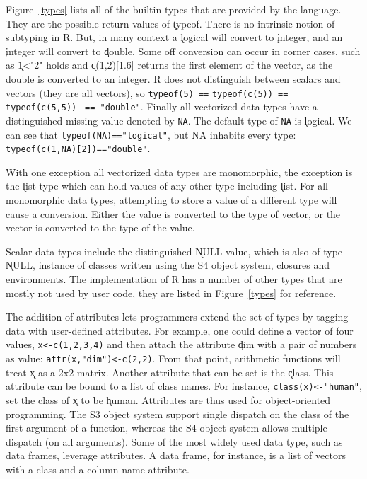 \documentclass[acmsmall,review,anonymous]{acmart}\settopmatter{printfolios=true,printccs=false,printacmref=false}
\newcommand{\code}[1]{{\lstinline[style=Rin]!#1!}\xspace}
\begin{document}
Figure~\ref{types} lists all of the builtin types that are provided by the
language. They are the possible return values of \k{typeof}. There is no
intrinsic notion of subtyping in R. But, in many context a \k{logical} will
convert to \k{integer}, and an \k{integer} will convert to \k{double}.  Some
off conversion can occur in corner cases, such as \k{1<"2"} holds and
\k{c(1,2)[1.6]} returns the first element of the vector, as the double is
converted to an integer. R does not distinguish between scalars and vectors
(they are all vectors), so \code{typeof(5) ==} \code{typeof(c(5)) ==
  typeof(c(5,5))} \code{ == "double"}. Finally all vectorized data types have a
distinguished missing value denoted by \code{NA}. The default type of
\code{NA} is \k{logical}. We can see that \code{typeof(NA)=="logical"}, but
NA inhabits every type: \code{typeof(c(1,NA)[2])=="double"}.

With one exception all vectorized data types are monomorphic, the exception
is the \k{list} type which can hold values of any other type including
\k{list}. For all monomorphic data types, attempting to store a value of a
different type will cause a conversion. Either the value is converted to the
type of vector, or the vector is converted to the type of the value.

Scalar data types include the distinguished \k{NULL} value, which is also of
type \k{NULL}, instance of classes written using the S4 object system,
closures and environments.  The implementation of R has a number of other
types that are mostly not used by user code, they are listed in
Figure~\ref{types} for reference.

The addition of attributes lets programmers extend the set of types by
tagging data with user-defined attributes. For example, one could define a
vector of four values, \code{x<-c(1,2,3,4)} and then attach the attribute
\k{dim} with a pair of numbers as value: \code{attr(x,"dim")<-c(2,2)}.  From
that point, arithmetic functions will treat \k{x} as a 2x2 matrix. Another
attribute that can be set is the \k{class}.  This attribute can be bound to
a list of class names. For instance, \code{class(x)<-"human"}, set the class
of \k{x} to be \k{human}.  Attributes are thus used for object-oriented
programming. The S3 object system support single dispatch on the class of
the first argument of a function, whereas the S4 object system allows
multiple dispatch (on all arguments). Some of the most widely used data
type, such as data frames, leverage attributes. A data frame, for instance,
is a list of vectors with a class and a column name attribute.
\end{document}
